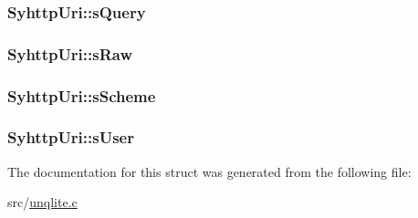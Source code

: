 \hypertarget{struct_syhttp_uri_af8de634c60754384545187b454f0a8cd}{
\subsubsection[{s\-Query}]{ Syhttp\-Uri\-::s\-Query}}\label{d3/d21/struct_syhttp_uri_af8de634c60754384545187b454f0a8cd}
\hypertarget{struct_syhttp_uri_a14b546650bec9c4d7a38fe2974d66b1c}{
\subsubsection[{s\-Raw}]{ Syhttp\-Uri\-::s\-Raw}}\label{d3/d21/struct_syhttp_uri_a14b546650bec9c4d7a38fe2974d66b1c}
\hypertarget{struct_syhttp_uri_a4cf1798c5ca5f2a4469ecedf081d4f78}{
\subsubsection[{s\-Scheme}]{ Syhttp\-Uri\-::s\-Scheme}}\label{d3/d21/struct_syhttp_uri_a4cf1798c5ca5f2a4469ecedf081d4f78}
\hypertarget{struct_syhttp_uri_ae3a640b7a59d8dbcfd8d7da703f53b55}{
\subsubsection[{s\-User}]{ Syhttp\-Uri\-::s\-User}}\label{d3/d21/struct_syhttp_uri_ae3a640b7a59d8dbcfd8d7da703f53b55}


The documentation for this struct was generated from the following file\-:\begin{DoxyCompactItemize}
\item 
src/\hyperlink{unqlite_8c}{unqlite.\-c}\end{DoxyCompactItemize}

